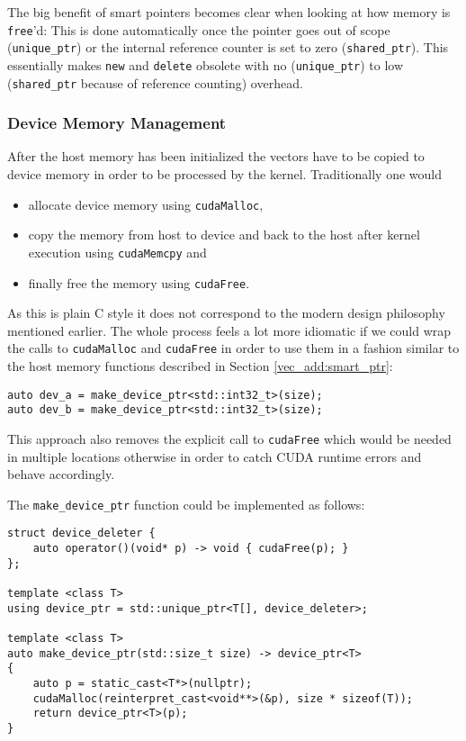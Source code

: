 The big benefit of smart pointers becomes clear when looking at how memory is \texttt{free}'d: This is done automatically once the pointer goes out of scope (\texttt{unique\_ptr}) or the internal reference counter is set to zero (\texttt{shared\_ptr}). This essentially makes \texttt{new} and \texttt{delete} obsolete with no (\texttt{unique\_ptr}) to low (\texttt{shared\_ptr} because of reference counting) overhead.

\subsubsection{Device Memory Management}

After the host memory has been initialized the vectors have to be copied to device memory in order to be processed by the kernel. Traditionally one would

\begin{itemize}
\item allocate device memory using \texttt{cudaMalloc},
\item copy the memory from host to device and back to the host after kernel execution using \texttt{cudaMemcpy} and
\item finally free the memory using \texttt{cudaFree}.
\end{itemize}

As this is plain C style it does not correspond to the modern design philosophy mentioned earlier. The whole process feels a lot more idiomatic if we could wrap the calls to \texttt{cudaMalloc} and \texttt{cudaFree} in order to use them in a fashion similar to the host memory functions described in Section \ref{vec_add:smart_ptr}:

\begin{lstlisting}
auto dev_a = make_device_ptr<std::int32_t>(size);
auto dev_b = make_device_ptr<std::int32_t>(size);
\end{lstlisting}

This approach also removes the explicit call to \texttt{cudaFree} which would be needed in multiple locations otherwise in order to catch CUDA runtime errors and behave accordingly.

The \texttt{make\_device\_ptr} function could be implemented as follows:

\begin{lstlisting}
struct device_deleter { 
    auto operator()(void* p) -> void { cudaFree(p); }
};

template <class T>
using device_ptr = std::unique_ptr<T[], device_deleter>;

template <class T>
auto make_device_ptr(std::size_t size) -> device_ptr<T>
{
    auto p = static_cast<T*>(nullptr);
    cudaMalloc(reinterpret_cast<void**>(&p), size * sizeof(T));
    return device_ptr<T>(p);
}
\end{lstlisting}

